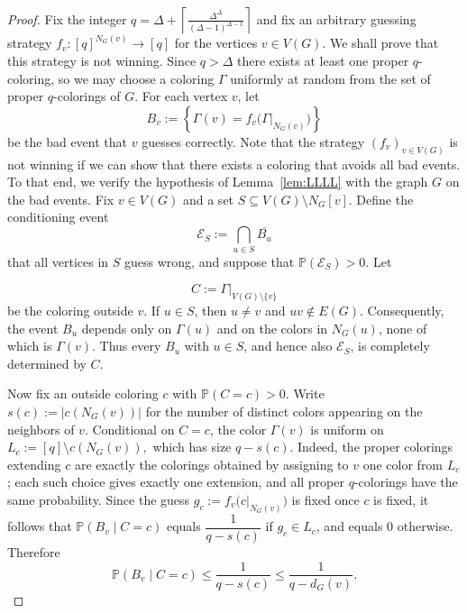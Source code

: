 \documentclass[a4paper,11pt]{amsproc}
\theoremstyle{plain}
\theoremstyle{definition}
\newcommand{\Prob}{\mathbb{P}}
\begin{document}
\begin{proof}
Fix the integer $q = \Delta+ \left\lceil \frac{\Delta^\Delta}{(\Delta-1)^{\Delta-1}}\right\rceil$ 
and fix an arbitrary guessing strategy
$f_v:[q]^{N_G(v)}\longrightarrow [q]$ for the vertices $v\in V(G)$.
We shall prove that this strategy is not winning.
Since $q>\Delta$ there exists at least one  proper $q$-coloring, so we may choose a coloring $\Gamma$ uniformly at random from the set of proper $q$-colorings of $G$.
For each vertex $v$, let
$$B_v:= \left\{\Gamma(v)=f_v\bigl(\Gamma|_{N_G(v)}\bigr)\right\}$$
be the bad event that $v$ guesses correctly. Note that the strategy $(f_v)_{v\in V(G)}$ is not winning if we can show that there exists a coloring that avoids all bad events. To that end, we verify the hypothesis of Lemma~\ref{lem:LLLL} with the graph $G$
on the bad events.  Fix $v\in V(G)$ and a set $S\subseteq V(G)\setminus N_G[v]$.
Define the conditioning event
$$\mathcal E_S:=\bigcap_{u\in S}\overline{B_u}$$
that all vertices in $S$ guess wrong, and suppose that $\Prob(\mathcal E_S)>0$.  Let

$$C:=\Gamma|_{V(G)\setminus\{v\}}$$
be the coloring outside $v$.  If $u\in S$, then $u\ne v$ and $uv\notin E(G)$.
Consequently, the event $B_u$ depends only on $\Gamma(u)$ and on the colors in
$N_G(u)$, none of which is $\Gamma(v)$.  Thus every $B_u$ with $u\in S$, and hence
also $\mathcal E_S$, is completely determined by $C$.

Now fix an outside coloring $c$ with $\Prob(C=c)>0$.  Write
$s(c):=\bigl|c(N_G(v))\bigr|$
for the number of distinct colors appearing on the neighbors of $v$.
Conditional on $C=c$, the color $\Gamma(v)$ is uniform on
$
  L_c:=[q]\setminus c(N_G(v)),
$
which has size $q-s(c)$.  Indeed, the proper colorings extending $c$ are
exactly the colorings obtained by assigning to $v$ one color from $L_c$;
each such choice gives exactly one extension, and all proper $q$-colorings
have the same probability.  Since the guess $g_c:=f_v\bigl(c|_{N_G(v)}\bigr)$
is fixed once $c$ is fixed, it follows that
$\Prob(B_v\mid C=c)$ equals $\dfrac{1}{q-s(c)}$ if $g_c\in L_c$, and equals $0$ otherwise.
Therefore
\begin{equation*}
\label{eq:BadeventGivenFixedOutsideColoring}
  \Prob(B_v\mid C=c) \le \frac{1}{q-s(c)} \le \frac{1}{q-d_G(v)}.
\end{equation*}


\end{proof}
\end{document}
